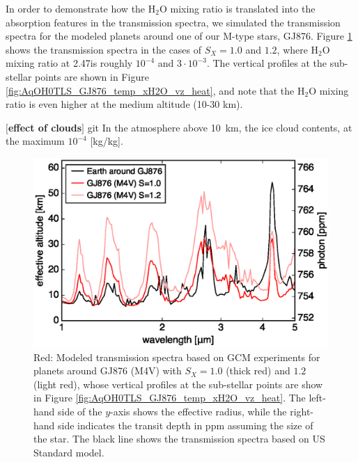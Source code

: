 \documentclass[11pt,numberedappendix,twocolappendix,]{emulateapj}
\def\water{H$_2$O }
\def\preslevel{2.47}
\def\memo#1{\color{red}$[${\bf #1}$]$ \color{black}}
\begin{document}
In order to demonstrate how the \water mixing ratio is translated into the absorption features in the transmission spectra, 
we simulated the transmission spectra for the modeled planets around one of our M-type stars, GJ876. 
Figure \ref{fig:transmission} shows the transmission spectra in the cases of $S_X=1.0$ and $1.2$, where \water mixing ratio at \preslevel is roughly $10^{-4}$ and $3\cdot 10^{-3}$. 
The vertical profiles at the sub-stellar points are shown in Figure \ref{fig:AqOH0TLS_GJ876_temp_xH2O_vz_heat}, and note that the \water mixing ratio is even higher at the medium altitude (10-30 km). 

\memo{effect of clouds}git
In the atmosphere above 10~km, the ice cloud contents, at the maximum $10^{-4}$ [kg/kg]. 






\begin{figure}[!h]
    \begin{center}
    \includegraphics[width=\hsize]{fig/transmission.eps}
    \end{center}
\caption{Red: Modeled transmission spectra based on GCM experiments for planets around GJ876 (M4V) with $S_X=1.0$ (thick red) and $1.2$ (light red), whose vertical profiles at the sub-stellar points are show in Figure \ref{fig:AqOH0TLS_GJ876_temp_xH2O_vz_heat}. The left-hand side of the $y$-axis shows the effective radius, while the right-hand side indicates the transit depth in ppm assuming the size of the star. The black line shows the transmission spectra based on US Standard model. }
\label{fig:transmission}
\end{figure}
\end{document}
